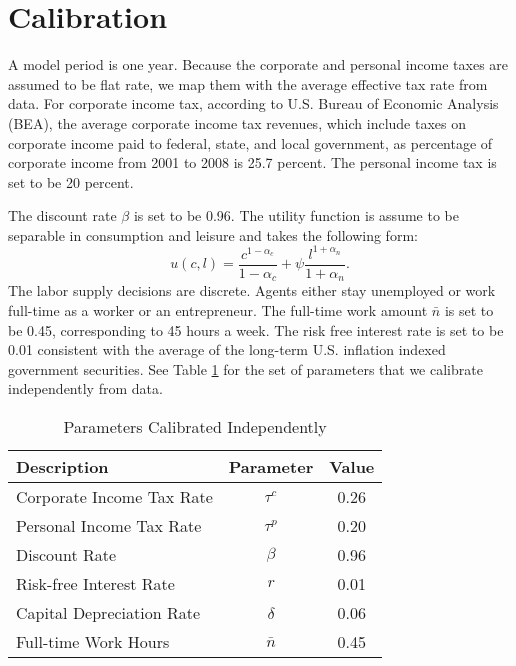 \documentclass[12pt]{article}
\begin{document}
\section{Calibration}

A model period is one year. Because the corporate and personal income taxes are assumed to be flat rate,
we map them with the average effective tax rate from data. For corporate
income tax, according to U.S. Bureau of Economic Analysis (BEA), the average
corporate income tax revenues, which include taxes on corporate income paid
to federal, state, and local government, as percentage of corporate income
from 2001 to 2008 is 25.7 percent. The personal income tax is set to be 20 percent. 

The discount rate $\beta$ is set to be 0.96. The utility function is assume to be separable
in consumption and leisure and takes the following form: 
\begin{equation}
u(c,l)=\frac{c^{1-\alpha_c}}{1-\alpha_c}+\psi\frac{l^{1+\alpha_n}}{1+\alpha_n}.
\end{equation}
The labor supply decisions are discrete. Agents either stay unemployed or
work full-time as a worker or an entrepreneur. The full-time work amount $%
\bar{n}$ is set to be 0.45, corresponding to 45 hours a week. The risk free
interest rate is set to be 0.01 consistent with the average of the long-term
U.S. inflation indexed government securities. See Table \ref{tab_para1} for the set of parameters that we
calibrate independently from data.

\begin{table}[!ht]
\caption{\sc Parameters Calibrated Independently}
\label{tab_para1}
\begin{center}
\begin{tabular}{lcc}
\hline\hline
Description &  Parameter &      Value \\
\hline
Corporate Income Tax Rate &   $\tau^c$ &       0.26 \\

Personal Income Tax Rate &   $\tau^p$ &       0.20 \\

Discount Rate &    $\beta$ &       0.96 \\

Risk-free Interest Rate &        $r$ &       0.01 \\

Capital Depreciation Rate &   $\delta$ &       0.06 \\

Full-time Work Hours &  $\bar{n}$ &       0.45 \\
\hline\hline
\end{tabular}  
\end{center}
\end{table}
\end{document}
